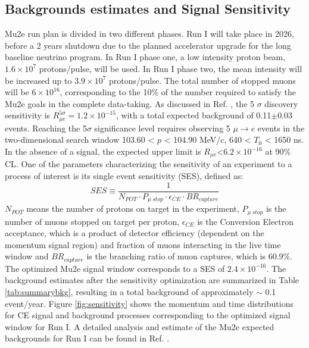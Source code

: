 \subsection{Backgrounds estimates and Signal Sensitivity}
Mu2e run plan is divided in two different phases. Run I will take place in 2026, before a 2 years shutdown due to the 
planned accelerator upgrade for the long baseline neutrino program. In Run I phase one, a low intensity proton beam, 
$1.6 \times 10^7$ protons/pulse, will be used. In Run I phase two, the mean intensity will be increased up to $3.9 \times 10^7$ 
protons/pulse. The total number of stopped muons will be $6 \times 10^{16}$, corresponding to the 10\% of the number required to 
satisfy the Mu2e goals in the complete data-taking. As discussed in Ref. \cite{universe9010054}, the 5 $\sigma$ discovery sensitivity is 
$R_{\mu e}^{5 \sigma} = 1.2 \times 10^{-15} $, with a total expected background of 0.11$\pm$0.03 events. 
Reaching the 5$\sigma$ significance level requires observing 5 $\mu\rightarrow e$ events in the two-dimensional search window 
103.60 < $p$ < 104.90 MeV/c, 640 < $T_0$ < 1650 ns. In the absence of a signal, the expected upper limit is $R_{\mu e}$<$6.2 \times 10^{-16}$
at 90\% CL. 
One of the parameters characterizing the sensitivity of an experiment to a process of interest is its
single event sensitivity (SES), defined as:
\begin{equation}
    SES \equiv \frac{1}{N_{POT} \cdot P_{\mu \ stop} \cdot \epsilon_{CE} \cdot BR_{capture}}
\end{equation} 
$N_{POT}$ means the number of protons on target in the experiment, $P_{\mu \ stop}$ is the number of muons stopped on target per proton, $\epsilon_{CE}$ is the Conversion Electron acceptance, which is a product of detector efficiency (dependent on the momentum signal region) and fraction of muons interacting in the live time window and $BR_{capture}$ is the branching ratio of muon captures, which is 60.9\%. The optimized Mu2e signal window corresponds to a SES of $2.4 \times 10^{-16}$. The background estimates after the sensitivity optimization are summarized in Table \ref{tab:summarybkg}, resulting in a total background of approximately $\sim$ 0.1 event/year. Figure \ref{fig:sensitivity} shows the momentum and time distributions for CE signal and background processes corresponding to the optimized signal window for Run I. A detailed analysis and estimate of the Mu2e expected backgrounds for Run I can be found in Ref. \cite{universe9010054}.

